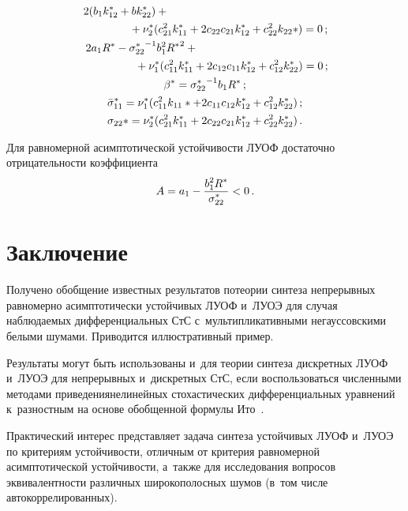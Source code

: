\begin{multicols}{2}
\noindent
\begin{gather*}
2(b_1k_{12}^* + b k_{22}^*) + {}\hspace*{50mm}\\
\hspace*{15mm}{}+\nu_2^* (c_{21}^2 k_{11}^* + 2 c_{22} c_{21} k_{12}^*+ c_{22}^2 k_{22}*)
=0\,; %
\\
   \hspace*{-40mm}2a_1 R^* - {\sigma_{22}^*}^{-1} b_1^2 {R^*}^2 +{}\\
\hspace*{17mm}{}+\nu_1^* (c_{11}^2 k_{11}^* + 2 c_{12} c_{11} k_{12}^* + c_{12}^2 k_{22}^*) =0\,; %
  \\
    \beta^* ={\sigma_{22}^*}^{-1} b_1 R^*\,; %
    \\
    \bar \sigma_{11}^* = \nu_1^* ( c_{11}^2 k_{11}* + 2 c_{11} c_{12} k_{12}^* + c_{12}^2 k_{22}^*)\,; %
    \\
    \sigma_{22}* = \nu_2^* (c_{21}^2 k_{11}^* + 2 c_{22} c_{21} k_{12}^* + c_{22}^2 k_{22}^*)\,. %
    \end{gather*}

Для равномерной асимптотической устойчи\-вости ЛУОФ достаточно отрицательности
коэффициента
    $$
    A= a_1 -\fr{b_1^2 R^*}{\sigma_{22}^*} < 0\,. %
    $$

\section{Заключение}

Получено обобщение известных результатов по\linebreak теории синтеза непрерывных равномерно
асимптотически устойчивых ЛУОФ и~ЛУОЭ для случая наблюдаемых дифференциальных СтС
с~мульти\-пликативными негауссовскими белыми шумами.  Приводится иллюстративный
пример.

Результаты могут быть использованы и~для \mbox{тео\-рии} синтеза дискретных ЛУОФ
и~ЛУОЭ для не\-пре\-рыв\-ных и~дискретных СтС, если
воспользоваться численными
методами приведения\linebreak нелинейных стохастических дифференциальных уравнений
к~разностным на основе обобщенной форму\-лы Ито~\cite{2-sk, 8-sk}.

Практический интерес представляет задача синтеза устойчивых ЛУОФ
и~ЛУОЭ по критериям устойчивости, отличным от критерия равномерной
асимптотической устойчивости, а~также для исследования вопросов
эквивалентности различных широкополосных шумов (в~том числе автокоррелированных).



\end{multicols}
